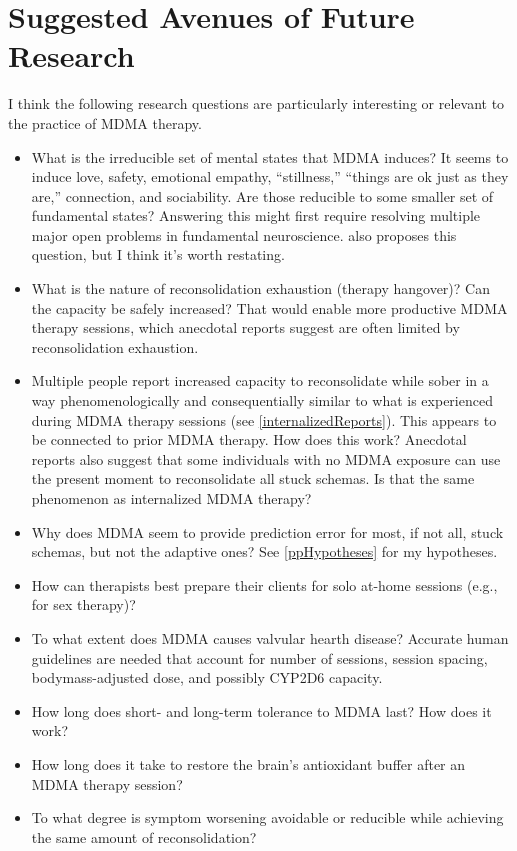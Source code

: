 \documentclass[11pt,oneside]{book}
\begin{document}
\chapter{Suggested Avenues of Future Research}
I think the following research questions are particularly interesting or relevant to the practice of MDMA therapy.
\begin{itemize}
    \item What is the irreducible set of mental states that MDMA induces? It seems to induce love, safety, emotional empathy, \enquote{stillness,} \enquote{things are ok just as they are,} connection, and sociability. Are those reducible to some smaller set of fundamental states? Answering this might first require resolving multiple major open problems in fundamental neuroscience. \textcite{regan2021Connection} also proposes this question, but I think it's worth restating.
    \item What is the nature of reconsolidation exhaustion (therapy hangover)? Can the capacity be safely increased? That would enable more productive MDMA therapy sessions, which anecdotal reports suggest are often limited by reconsolidation exhaustion.
    \item Multiple people report increased capacity to reconsolidate while sober in a way phenomenologically and consequentially similar to what is experienced during MDMA therapy sessions (see \cref{internalizedReports}). This appears to be connected to prior MDMA therapy. How does this work? Anecdotal reports also suggest that some individuals with no MDMA exposure can use the present moment to reconsolidate all stuck schemas. Is that the same phenomenon as internalized MDMA therapy?
    \item Why does MDMA seem to provide prediction error for most, if not all, stuck schemas, but not the adaptive ones? See \cref{ppHypotheses} for my hypotheses.
    \item How can therapists best prepare their clients for solo at-home sessions (e.g., for sex therapy)?
    \item To what extent does MDMA causes valvular hearth disease? Accurate human guidelines are needed that account for number of sessions, session spacing, bodymass-adjusted dose, and possibly CYP2D6 capacity.
    \item How long does short- and long-term tolerance to MDMA last? How does it work?
    \item How long does it take to restore the brain's antioxidant buffer after an MDMA therapy session?
    \item To what degree is symptom worsening avoidable or reducible while achieving the same amount of reconsolidation?

\end{itemize}
\end{document}
